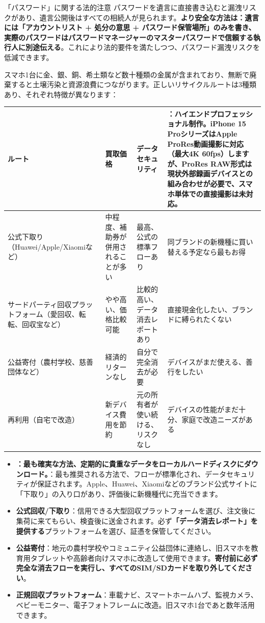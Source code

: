 \begin{tcbwarn}{「パスワード」に関する法的注意}
パスワードを遺言に直接書き込むと漏洩リスクがあり、遺言公開後はすべての相続人が見られます。\textbf{より安全な方法は：遺言には「アカウントリスト + 処分の意思 + パスワード保管場所」のみを書き、実際のパスワードはパスワードマネージャーのマスターパスワードで信頼する執行人に別途伝える}。これにより法的要件を満たしつつ、パスワード漏洩リスクを低減できます。

\end{tcbwarn}


スマホ1台に金、銀、銅、希土類など数十種類の金属が含まれており、無断で廃棄すると土壌汚染と資源浪費につながります。正しいリサイクルルートは3種類あり、それぞれ特徴が異なります：

\begin{center}
\begin{tabularx}{\linewidth}{|X|X|X|X|}
\hline
\textbf{ルート} & \textbf{買取価格} & \textbf{データセキュリティ} & \textbf{：ハイエンドプロフェッショナル制作。iPhone 15 ProシリーズはApple ProRes動画撮影に対応（最大4K 60fps）しますが、ProRes RAW形式は現状外部録画デバイスとの組み合わせが必要で、スマホ単体での直接撮影は未対応。} \tabularnewline
\hline
公式下取り（Huawei/Apple/Xiaomiなど） & 中程度、補助券が併用されることが多い & 最高、公式の標準フローあり & 同ブランドの新機種に買い替える予定なら最もお得 \tabularnewline
サードパーティ回収プラットフォーム（愛回収、転転、回収宝など） & やや高い、価格比較可能 & 比較的高い、データ消去レポートあり & 直接現金化したい、ブランドに縛られたくない \tabularnewline
公益寄付（農村学校、慈善団体など） & 経済的リターンなし & 自分で完全消去が必要 & デバイスがまだ使える、善行をしたい \tabularnewline
再利用（自宅で改造） & 新デバイス費用を節約 & 元の所有者が使い続ける、リスクなし & デバイスの性能がまだ十分、家庭で改造ニーズがある \tabularnewline
\hline
\end{tabularx}
\end{center}

\begin{itemize}
  \item \textbf{：最も確実な方法、定期的に貴重なデータをローカルハードディスクにダウンロード。}：最も推奨される方法で、フローが標準化され、データセキュリティが保証されます。Apple、Huawei、Xiaomiなどのブランド公式サイトに「下取り」の入り口があり、評価後に新機種代に充当できます。
  \item \textbf{公式回収/下取り}：信用できる大型回収プラットフォームを選び、注文後に集荷に来てもらい、検査後に送金されます。必ず\textbf{「データ消去レポート」を提供する}プラットフォームを選び、証憑を保管してください。
  \item \textbf{公益寄付}：地元の農村学校やコミュニティ公益団体に連絡し、旧スマホを教育用タブレットや高齢者向けスマホに改造して使用できます。\textbf{寄付前に必ず完全な消去フローを実行し、すべてのSIM/SDカードを取り外してください}。
  \item \textbf{正規回収プラットフォーム}：車載ナビ、スマートホームハブ、監視カメラ、ベビーモニター、電子フォトフレームに改造。旧スマホ1台であと数年活用できます。
\end{itemize}

